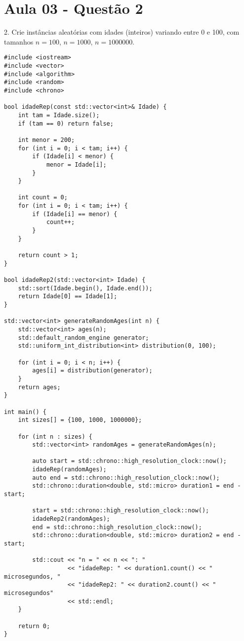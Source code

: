 \section{Aula 03 - Questão 2}

2. Crie instâncias aleatórias com idades (inteiros) variando entre 0 e 100, com tamanhos \( n = 100 \), \( n = 1000 \), \( n = 1000000 \).

\begin{verbatim}
#include <iostream>
#include <vector>
#include <algorithm>
#include <random>
#include <chrono>

bool idadeRep(const std::vector<int>& Idade) {
    int tam = Idade.size();
    if (tam == 0) return false;

    int menor = 200;  
    for (int i = 0; i < tam; i++) {
        if (Idade[i] < menor) {
            menor = Idade[i];
        }
    }

    int count = 0;
    for (int i = 0; i < tam; i++) {
        if (Idade[i] == menor) {
            count++;
        }
    }

    return count > 1; 
}

bool idadeRep2(std::vector<int> Idade) {
    std::sort(Idade.begin(), Idade.end());
    return Idade[0] == Idade[1];
}

std::vector<int> generateRandomAges(int n) {
    std::vector<int> ages(n);
    std::default_random_engine generator;
    std::uniform_int_distribution<int> distribution(0, 100);

    for (int i = 0; i < n; i++) {
        ages[i] = distribution(generator);
    }
    return ages;
}

int main() {
    int sizes[] = {100, 1000, 1000000};

    for (int n : sizes) {
        std::vector<int> randomAges = generateRandomAges(n);
        
        auto start = std::chrono::high_resolution_clock::now();
        idadeRep(randomAges);
        auto end = std::chrono::high_resolution_clock::now();
        std::chrono::duration<double, std::micro> duration1 = end - start;

        start = std::chrono::high_resolution_clock::now();
        idadeRep2(randomAges);
        end = std::chrono::high_resolution_clock::now();
        std::chrono::duration<double, std::micro> duration2 = end - start;

        std::cout << "n = " << n << ": "
                  << "idadeRep: " << duration1.count() << " microsegundos, "
                  << "idadeRep2: " << duration2.count() << " microsegundos" 
                  << std::endl;
    }

    return 0;
}

\end{verbatim}